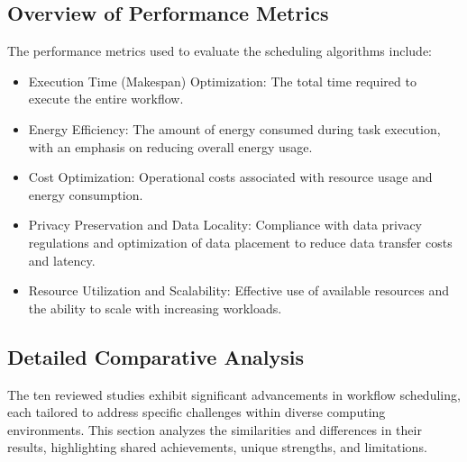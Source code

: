 \documentclass[a4paper, final]{article}
\begin{document}
\subsection{Overview of Performance Metrics}
The performance metrics used to evaluate the scheduling algorithms include:
\begin{itemize}
    \item Execution Time (Makespan) Optimization: The total time required to execute the entire workflow.

    \item Energy Efficiency: The amount of energy consumed during task execution, with an emphasis 
    on reducing overall energy usage.
    
    \item Cost Optimization: Operational costs associated with resource usage and energy consumption.
    
    \item Privacy Preservation and Data Locality: Compliance with data privacy regulations and 
    optimization of data placement to reduce data transfer costs and latency.
    
    \item Resource Utilization and Scalability: Effective use of available resources and the ability 
    to scale with increasing workloads.
\end{itemize}

\subsection{Detailed Comparative Analysis}
The ten reviewed studies exhibit significant advancements in workflow scheduling, each tailored to address 
specific challenges within diverse computing environments. This section analyzes the similarities and differences 
in their results, highlighting shared achievements, unique strengths, and limitations.
\end{document}
